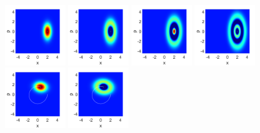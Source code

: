 \documentclass[12pt]{iopart} %
\begin{document}
\begin{figure} 
\begin{centering}
  	  \includegraphics[width=0.24\textwidth]{State0t0OrthoPos.pdf}
	  \includegraphics[width=0.24\textwidth]{State1t0OrthoPos.pdf}
	  \includegraphics[width=0.24\textwidth]{State2t0OrthoPos.pdf}
	  \includegraphics[width=0.24\textwidth]{State3t0OrthoPos.pdf}\\
	  \includegraphics[width=0.24\textwidth]{State0t5OrthoPos.pdf}
	  \includegraphics[width=0.24\textwidth]{State1t5OrthoPos.pdf}

\end{centering}
\end{figure}
\end{document}
